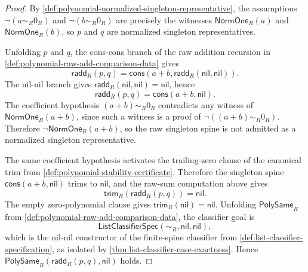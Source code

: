 \begin{proof}
By \autoref{def:polynomial-normalized-singleton-representative}, the assumptions $\neg(a\sim_R0_R)$ and $\neg(b\sim_R0_R)$ are precisely the witnesses $\mathsf{NormOne}_R(a)$ and $\mathsf{NormOne}_R(b)$, so $p$ and $q$ are normalized singleton representatives.

Unfolding $p$ and $q$, the cons-cons branch of the raw addition recursion in \autoref{def:polynomial-raw-add-comparison-data} gives
$$
\mathsf{radd}_R(p,q)
=\mathsf{cons}(a+b,\mathsf{radd}_R(\mathsf{nil},\mathsf{nil})).
$$
The nil-nil branch gives $\mathsf{radd}_R(\mathsf{nil},\mathsf{nil})=\mathsf{nil}$, hence
$$
\mathsf{radd}_R(p,q)=\mathsf{cons}(a+b,\mathsf{nil}).
$$
The coefficient hypothesis $(a+b)\sim_R0_R$ contradicts any witness of $\mathsf{NormOne}_R(a+b)$, since such a witness is a proof of $\neg((a+b)\sim_R0_R)$. Therefore $\neg\mathsf{NormOne}_R(a+b)$, so the raw singleton spine is not admitted as a normalized singleton representative.

The same coefficient hypothesis activates the trailing-zero clause of the canonical trim from \autoref{def:polynomial-stability-certificate}. Therefore the singleton spine $\mathsf{cons}(a+b,\mathsf{nil})$ trims to $\mathsf{nil}$, and the raw-sum computation above gives
$$
\mathsf{trim}_R(\mathsf{radd}_R(p,q))=\mathsf{nil}.
$$
The empty zero-polynomial clause gives $\mathsf{trim}_R(\mathsf{nil})=\mathsf{nil}$. Unfolding $\mathsf{PolySame}_R$ from \autoref{def:polynomial-raw-add-comparison-data}, the classifier goal is
$$
\mathsf{ListClassifierSpec}(\sim_R,\mathsf{nil},\mathsf{nil}),
$$
which is the nil-nil constructor of the finite-spine classifier from \autoref{def:list-classifier-specification}, as isolated by \autoref{thm:list-classifier-case-exactness}. Hence $\mathsf{PolySame}_R(\mathsf{radd}_R(p,q),\mathsf{nil})$ holds.
\end{proof}
